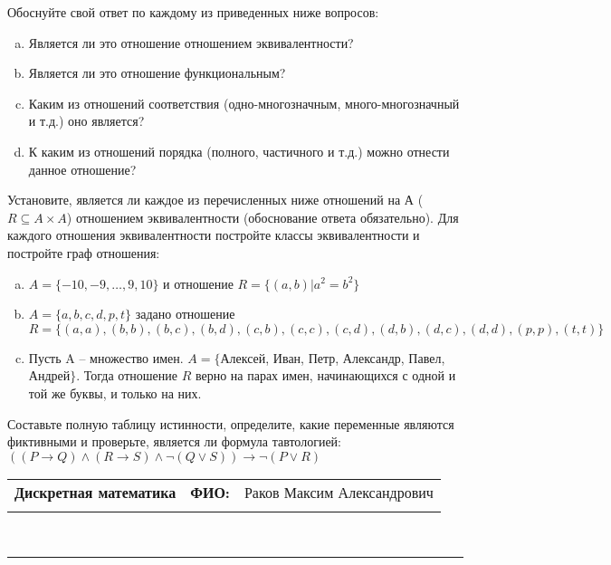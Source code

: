 \documentclass[10pt]{exam}
\newcommand{\class}{Дискретная математика}
\newcommand{\examdate}{}
\begin{document}
\begin{questions}
Обоснуйте свой ответ по каждому из приведенных ниже вопросов:
\begin{enumerate} [a)]\setcounter{enumi}{0}
    \item Является ли это отношение отношением эквивалентности?
    \item Является ли это отношение функциональным?
    \item Каким из отношений соответствия (одно-многозначным, много-многозначный и т.д.) оно является?
    \item К каким из отношений порядка (полного, частичного и т.д.) можно отнести данное отношение?
\end{enumerate}
\question
Установите, является ли каждое из перечисленных ниже отношений на А ($R \subseteq A \times A$) отношением эквивалентности (обоснование ответа обязательно). Для каждого отношения эквивалентности постройте классы 
эквивалентности и постройте граф отношения:
\begin{enumerate} [a)]\setcounter{enumi}{0}
\item $A = \{-10, -9, … , 9, 10\}$ и отношение $R = \{(a,b)|a^{2} = b^{2}\}$
\item $A = \{a, b, c, d, p, t\}$ задано отношение $R = \{(a, a), (b, b), (b, c), (b, d), (c, b), (c, c), (c, d), (d, b), (d, c), (d, d), (p,p), (t,t)\}$
\item Пусть A – множество имен. $A = \{ $Алексей, Иван, Петр, Александр, Павел, Андрей$ \}$. Тогда отношение $R$ верно на парах имен, начинающихся с одной и той же буквы, и только на них.
\end{enumerate}\question Составьте полную таблицу истинности, определите, какие переменные являются фиктивными и проверьте, является ли формула тавтологией:
$((P \rightarrow Q) \land (R \rightarrow S) \land \neg (Q \lor S)) \rightarrow \neg (P \lor R)$

\end{questions}
\newpage
\begin{flushright}
\begin{tabular}{p{2.8in} r l}
\textbf{\class} & \textbf{ФИО:} &Раков Максим Александрович
\\

\textbf{\examdate} &&\\
\end{tabular}\\
\end{flushright}
\rule[1ex]{\textwidth}{.1pt}
\end{document}
